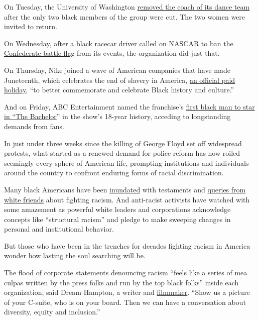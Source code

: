 On Tuesday, the University of Washington
\href{https://www.seattletimes.com/sports/uw-huskies/uw-removes-dance-coach-asks-black-members-to-rejoin-team-and-pledges-to-include-diversity-in-tryout-process/?utm_medium=notification\&utm_source=pushly\&utm_campaign=564808}{removed
the coach of its dance team} after the only two black members of the
group were cut. The two women were invited to return.

On Wednesday, after a black racecar driver called on NASCAR to ban the
\href{https://www.nytimes3xbfgragh.onion/news-event/confederate-flags-monuments-statues}{Confederate
battle flag} from its events, the organization did just that.

On Thursday, Nike joined a wave of American companies that have made
Juneteenth, which celebrates the end of slavery in America,
\href{https://www.nytimes3xbfgragh.onion/aponline/2020/06/12/business/ap-juneteenth-company-holiday.html}{an
official paid holiday}, ``to better commemorate and celebrate Black
history and culture.''

And on Friday, ABC Entertainment named the franchise's
\href{https://www.nytimes3xbfgragh.onion/2020/06/12/arts/television/matt-james-black-bachelor.html}{first
black man to star in ``The Bachelor}'' in the show's 18-year history,
acceding to longstanding demands from fans.

In just under three weeks since the killing of George Floyd set off
widespread protests, what started as a renewed demand for police reform
has now roiled seemingly every sphere of American life, prompting
institutions and individuals around the country to confront enduring
forms of racial discrimination.

Many black Americans have been
\href{https://medium.com/the-faculty/white-academia-do-better-fa96cede1fc5}{inundated}
with testaments and
\href{https://twitter.com/sarahcpr/status/1268231406351613952}{queries
from white friends} about fighting racism. And anti-racist activists
have watched with some amazement as powerful white leaders and
corporations acknowledge concepts like ``structural racism'' and pledge
to make sweeping changes in personal and institutional behavior.

But those who have been in the trenches for decades fighting racism in
America wonder how lasting the soul searching will be.

The flood of corporate statements denouncing racism ``feels like a
series of mea culpas written by the press folks and run by the top black
folks'' inside each organization, said Dream Hampton, a writer and
\href{https://vimeo.com/307655948}{filmmaker}. ``Show us a picture of
your C-suite, who is on your board. Then we can have a conversation
about diversity, equity and inclusion.''

